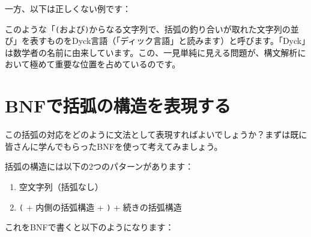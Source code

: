 \begin{Shaded}
\begin{Highlighting}[]
\KeywordTok{()}          \ExtensionTok{//}
\KeywordTok{(())}        \ExtensionTok{//}
\KeywordTok{((}
\end{Highlighting}
\end{Shaded}

一方、以下は正しくない例です：

\begin{Shaded}
\begin{Highlighting}[]
\NormalTok{)}\KeywordTok{(}          \ExtensionTok{//}
\KeywordTok{((}
\end{Highlighting}
\end{Shaded}

このような「\texttt{(}および\texttt{)}からなる文字列で、括弧の釣り合いが取れた文字列の並び」を表すものをDyck言語（「ディック言語」と読みます）と呼びます。「Dyck」は数学者の名前に由来しています。この、一見単純に見える問題が、構文解析において極めて重要な位置を占めているのです。

\hypertarget{chapter4-bnfux3067ux62ecux5f27ux306eux69cbux9020ux3092ux8868ux73feux3059ux308b}{%
\section{BNFで括弧の構造を表現する}\label{chapter4-bnfux3067ux62ecux5f27ux306eux69cbux9020ux3092ux8868ux73feux3059ux308b}}

この括弧の対応をどのように文法として表現すればよいでしょうか？まずは既に皆さんに学んでもらったBNFを使って考えてみましょう。

括弧の構造には以下の2つのパターンがあります：

\begin{enumerate}
\def\labelenumi{\arabic{enumi}.}
\tightlist
\item
  空文字列（括弧なし）
\item
  \texttt{(} + 内側の括弧構造 + \texttt{)} + 続きの括弧構造
\end{enumerate}

これをBNFで書くと以下のようになります：

\begin{Shaded}
\begin{Highlighting}[]
\NormalTok{ = }\KeywordTok{|} \NormalTok{;}
\end{Highlighting}
\end{Shaded}

